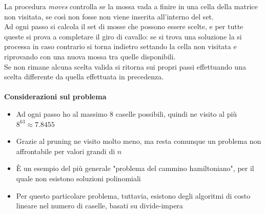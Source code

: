 \documentclass[../cheatSheetAlgoritmi.tex]{subfiles}
\begin{document}
La procedura \emph{moves} controlla se la mossa vada a finire in una cella della matrice non visitata, se così non fosse non viene inserita all'interno del set. \\
Ad ogni passo si calcola il set di mosse che possono essere scelte, e per tutte queste si prova a completare il giro di cavallo: se si trova una soluzione la si processa in caso contrario si torna indietro settando la cella non visitata e riprovando con una nuova mossa tra quelle disponibili. \\
Se non rimane alcuna scelta valida si ritorna sui propri passi effettuando una scelta differente da quella effettuata in precedenza. \\\\
\textbf{Considerazioni sul problema}
\begin{itemize}
	\item Ad ogni passo ho al massimo $8$ caselle possibili, quindi ne visito al più $8^{63} \approx 7.8455$
	\item Grazie al pruning ne visito molto meno, ma resta comunque un problema non affrontabile per valori grandi di $n$
	\item È un esempio del più generale "problema del cammino hamiltoniano", per il quale non esistono soluzioni polinomiali
	\item Per questo particolare problema, tuttavia, esistono degli algoritmi di costo lineare nel numero di caselle, basati su divide-impera
\end{itemize}
\end{document}
